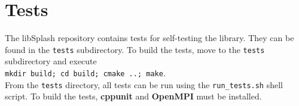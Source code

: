 \documentclass[a4paper,10pt,BCOR12mm]{report}
\newcommand{\command}[1]{\small \texttt{#1}}
\begin{document}
\section{Tests}

The libSplash repository contains tests for self-testing the library. They can be found in the
\command{tests} subdirectory. To build the tests, move to the \command{tests} subdirectory and execute\\
\command{mkdir build; cd build; cmake ..; make}.\\
From the \command{tests} directory, all tests can be run using the \command{run\_tests.sh} shell script.
To build the tests, \textbf{cppunit} and \textbf{OpenMPI} must be installed.

\end{document}
